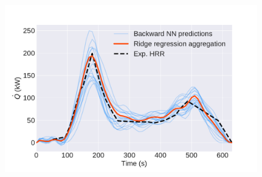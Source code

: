 \documentclass{article}
\begin{document}
\begin{figure}[htb] \centering
\includegraphics[width=.75\textwidth]{figures/backward_ridge_aggregation.pdf}
\caption{}
\label{fig:backward_ridge_aggregation}
\end{figure}
\end{document}
